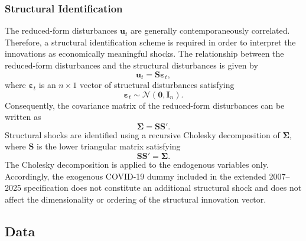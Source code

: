 \documentclass[12pt]{scrartcl}
\numberwithin{equation}{section}				%
\begin{document}
    \subsubsection{Structural Identification}
    
    The reduced-form disturbances $\mathbf{u}_t$ are generally contemporaneously
    correlated. Therefore, a structural identification scheme is required in
    order to interpret the innovations as economically meaningful shocks. The
    relationship between the reduced-form disturbances and the structural
    disturbances is given by 
    \begin{equation}
    	\mathbf{u}_t
    	=
    	\mathbf{S}\boldsymbol{\varepsilon}_t,
    \end{equation}
    where $\boldsymbol{\varepsilon}_t$ is an $n \times 1$ vector of structural
    disturbances satisfying
    \begin{equation}
    	\boldsymbol{\varepsilon}_t
    	\sim
    	\mathcal{N}(\mathbf{0},\mathbf{I}_n).
    \end{equation}
    Consequently, the covariance matrix of the reduced-form disturbances can be
    written as
    \begin{equation}
    	\boldsymbol{\Sigma}
    	=
    	\mathbf{S}\mathbf{S}'.
    \end{equation}
    Structural shocks are identified using a recursive Cholesky decomposition of
    $\boldsymbol{\Sigma}$, where $\mathbf{S}$ is the lower triangular matrix
    satisfying
\\
    \begin{equation}
    	\mathbf{S}\mathbf{S}'
    	=
    	\boldsymbol{\Sigma}.
    \end{equation}  
    The Cholesky decomposition is applied to the endogenous variables only.
    Accordingly, the exogenous COVID-19 dummy included in the extended
    2007--2025 specification does not constitute an additional structural shock
    and does not affect the dimensionality or ordering of the structural
    innovation vector.
    
    \subsection{Data}
    
\end{document}
